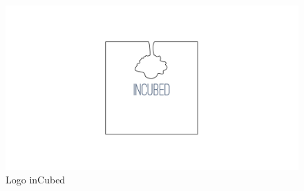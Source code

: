 
\begin{figure}[ht]%
	\centering
		\includegraphics[width=1.0\textwidth]{images/Logo}
	\caption{Logo inCubed}
	\label{fig:Logo}
\end{figure}
